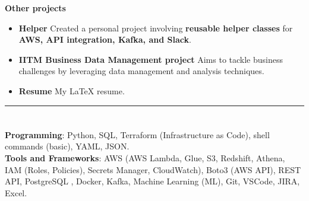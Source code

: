 \documentclass[a4paper,10pt]{article}
\begin{document}
\vspace{-2mm}
\textbf{Other projects}
\vspace{-2mm}
\begin{itemize}
    \item \textbf{Helper} \href{https://github.com/ShreehariA/helpers}{} Created a personal project involving \textbf{reusable helper classes} for \textbf{AWS, API integration, Kafka, and Slack}.
    \vspace{-6mm}
    \item \textbf{IITM Business Data Management project} \href{https://github.com/ShreehariA/IITM_BDM_Project}{} Aims to tackle business challenges by leveraging data management and analysis techniques.
    \vspace{-2mm}
    \item \textbf{Resume} \href{https://github.com/ShreehariA/Resume}{} My LaTeX resume.
\end{itemize}

\hrule
\vspace{-4mm}
\section{\scshape\color{Fuchsia}{\faTools\ \textbf TECHNICAL SKILLS}}
\textbf{Programming}: Python, SQL, Terraform (Infrastructure as Code), shell commands (basic), YAML, JSON. \\
\textbf{Tools and Frameworks}: AWS (AWS Lambda, Glue, S3, Redshift, Athena, IAM (Roles, Policies), Secrets Manager, CloudWatch), Boto3 (AWS API), REST API, PostgreSQL
, Docker, Kafka, Machine Learning (ML), Git, VSCode, JIRA, Excel.
\end{document}
